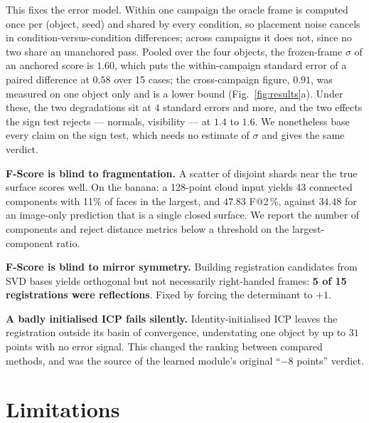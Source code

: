 \documentclass[conference]{IEEEtran}
\makeatletter
\newcommand{\Fs}{F@2\,\%}
\makeatother
\begin{document}
This fixes the error model. Within one campaign the oracle frame is computed once per
(object, seed) and shared by every condition, so placement noise cancels in
condition-versus-condition differences; across campaigns it does not, since no two
share an unanchored pass. Pooled over the four objects, the frozen-frame $\sigma$ of an
anchored score is $1.60$, which puts the within-campaign standard error of a paired
difference at $0.58$ over 15 cases; the cross-campaign figure, $0.91$, was measured on
one object only and is a lower bound (Fig.~\ref{fig:results}a). Under these, the two
degradations sit at $4$ standard errors and more, and the two effects the sign test
rejects --- normals, visibility --- at $1.4$ to $1.6$. We nonetheless base every claim
on the sign test, which needs no estimate of $\sigma$ and gives the same verdict.

\textbf{F-Score is blind to fragmentation.} A scatter of disjoint shards near the true
surface scores well. On the banana: a 128-point cloud input yields 43 connected
components with 11\% of faces in the largest, and $47.83$ \Fs, against $34.48$ for an
image-only prediction that is a single closed surface. We report the number of
components and reject distance metrics below a threshold on the largest-component
ratio.

\textbf{F-Score is blind to mirror symmetry.} Building registration candidates from
SVD bases yields orthogonal but not necessarily right-handed frames: \textbf{5 of 15
registrations were reflections}. Fixed by forcing the determinant to $+1$.

\textbf{A badly initialised ICP fails silently.} Identity-initialised ICP leaves the
registration outside its basin of convergence, understating one object by up to $31$
points with no error signal. This changed the ranking between compared methods, and
was the source of the learned module's original ``$-8$ points'' verdict.

\section{Limitations}
\end{document}
